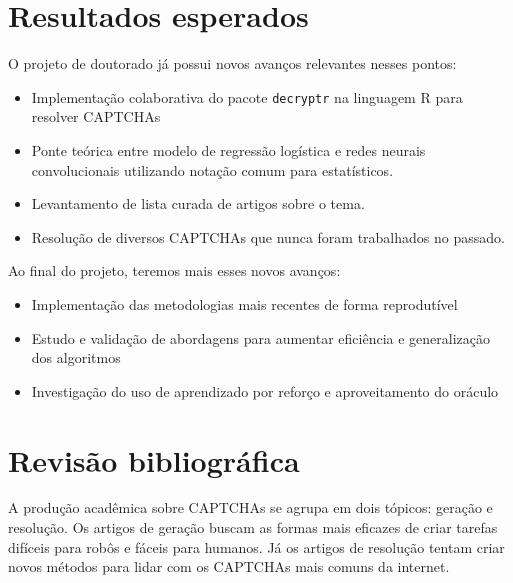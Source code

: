 \documentclass[12pt,]{report}
\providecommand{\tightlist}{%
  \setlength{\itemsep}{0pt}\setlength{\parskip}{0pt}}
\begin{document}
\hypertarget{resultados-esperados}{%
\section{Resultados esperados}\label{resultados-esperados}}

O projeto de doutorado já possui novos avanços relevantes nesses pontos:

\begin{itemize}
\tightlist
\item
  Implementação colaborativa do pacote \texttt{decryptr} na linguagem R para resolver CAPTCHAs
\item
  Ponte teórica entre modelo de regressão logística e redes neurais convolucionais utilizando notação comum para estatísticos.
\item
  Levantamento de lista curada de artigos sobre o tema.
\item
  Resolução de diversos CAPTCHAs que nunca foram trabalhados no passado.
\end{itemize}

Ao final do projeto, teremos mais esses novos avanços:

\begin{itemize}
\tightlist
\item
  Implementação das metodologias mais recentes de forma reprodutível
\item
  Estudo e validação de abordagens para aumentar eficiência e generalização dos algoritmos
\item
  Investigação do uso de aprendizado por reforço e aproveitamento do oráculo
\end{itemize}

\hypertarget{revisuxe3o-bibliogruxe1fica}{%
\section{Revisão bibliográfica}\label{revisuxe3o-bibliogruxe1fica}}

A produção acadêmica sobre CAPTCHAs se agrupa em dois tópicos: geração e resolução. Os artigos de geração buscam as formas mais eficazes de criar tarefas difíceis para robôs e fáceis para humanos. Já os artigos de resolução tentam criar novos métodos para lidar com os CAPTCHAs mais comuns da internet.
\end{document}
